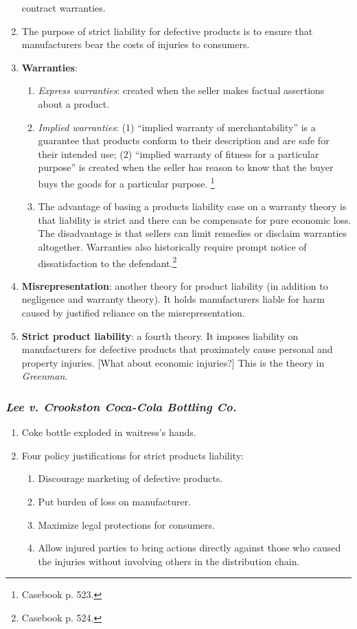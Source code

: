 \begin{enumerate}
    contract warranties.  \item The purpose of strict liability for defective 
    products is to ensure that manufacturers bear the costs of injuries to 
    consumers.
    \item \textbf{Warranties}:
    \begin{enumerate}
        \item \emph{Express warranties}: created when the seller makes factual 
        assertions about a product.
        \item \emph{Implied warranties}: (1) ``implied warranty of 
        merchantability'' is a guarantee that products conform to their 
        description and are safe for their intended use; (2) ``implied warranty 
        of fitness for a particular purpose'' is created when the seller has 
        reason to know that the buyer buys the goods for a particular purpose. 
        \footnote{Casebook p. 523.}
        \item The advantage of basing a products liability case on a warranty 
        theory is that liability is strict and there can be compensate for pure 
        economic loss. The disadvantage is that sellers can limit remedies or 
        disclaim warranties altogether. Warranties also historically require 
        prompt notice of dissatisfaction to the defendant.\footnote{Casebook p. 
        524.}
    \end{enumerate}
    \item \textbf{Misrepresentation}: another theory for product liability (in 
    addition to negligence and warranty theory). It holds manufacturers liable 
    for harm caused by justified reliance on the misrepresentation.
    \item \textbf{Strict product liability}: a fourth theory. It imposes 
    liability on manufacturers for defective products that proximately cause 
    personal and property injuries. [What about economic injuries?] This is the 
    theory in \emph{Greenman}.
\end{enumerate}

\subsubsection{\emph{Lee v. Crookston Coca-Cola Bottling Co.}}

\begin{enumerate}
    \item Coke bottle exploded in waitress's hands.
    \item Four policy justifications for strict products liability:
    \begin{enumerate}
        \item Discourage marketing of defective products.
        \item Put burden of loss on manufacturer.
        \item Maximize legal protections for consumers.
        \item Allow injured parties to bring actions directly against those who 
        caused the injuries without involving others in the distribution chain.
    \end{enumerate}
\end{enumerate}

